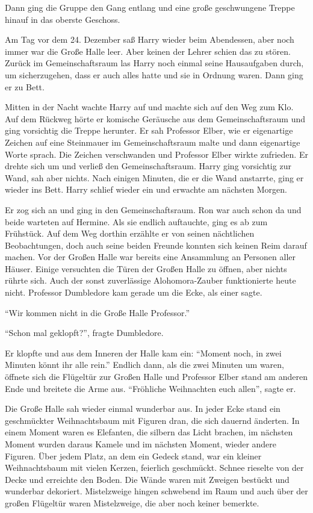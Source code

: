 Dann ging die Gruppe den Gang entlang und eine große geschwungene Treppe hinauf in das oberste Geschoss.

Am Tag vor dem 24. Dezember saß Harry wieder beim Abendessen, aber noch immer war die Große Halle leer. Aber keinen der Lehrer schien das zu stören. Zurück im Gemeinschaftsraum las Harry noch einmal seine Hausaufgaben durch, um sicherzugehen, dass er auch alles hatte und sie in Ordnung waren. Dann ging er zu Bett.

Mitten in der Nacht wachte Harry auf und machte sich auf den Weg zum Klo. Auf dem Rückweg hörte er komische Geräusche aus dem Gemeinschaftsraum und ging vorsichtig die Treppe herunter. Er sah Professor Elber, wie er eigenartige Zeichen auf eine Steinmauer im Gemeinschaftsraum malte und dann eigenartige Worte sprach. Die Zeichen verschwanden und Professor Elber wirkte zufrieden. Er drehte sich um und verließ den Gemeinschaftsraum. Harry ging vorsichtig zur Wand, sah aber nichts. Nach einigen Minuten, die er die Wand anstarrte, ging er wieder ins Bett.  Harry schlief wieder ein und erwachte am nächsten Morgen.

Er zog sich an und ging in den Gemeinschaftsraum. Ron war auch schon da und beide warteten auf Hermine. Als sie endlich auftauchte, ging es ab zum Frühstück. Auf dem Weg dorthin erzählte er von seinen nächtlichen Beobachtungen, doch auch seine beiden Freunde konnten sich keinen Reim darauf machen. Vor der Großen Halle war bereits eine Ansammlung an Personen aller Häuser. Einige versuchten die Türen der Großen Halle zu öffnen, aber nichts rührte sich. Auch der sonst zuverlässige Alohomora-Zauber funktionierte heute nicht. Professor Dumbledore kam gerade um die Ecke, als einer sagte.

\enquote{Wir kommen nicht in die Große Halle Professor.}

\enquote{Schon mal geklopft?}, fragte Dumbledore.

Er klopfte und aus dem Inneren der Halle kam ein: \enquote{Moment noch, in zwei Minuten könnt ihr alle rein.}  Endlich dann, als die zwei Minuten um waren, öffnete sich die Flügeltür zur Großen Halle und Professor Elber stand am anderen Ende und breitete die Arme aus. \enquote{Fröhliche Weihnachten euch allen}, sagte er.

Die Große Halle sah wieder einmal wunderbar aus. In jeder Ecke stand ein geschmückter Weihnachtsbaum mit Figuren dran, die sich dauernd änderten. In einem Moment waren es Elefanten, die silbern das Licht brachen, im nächsten Moment wurden daraus Kamele und im nächsten Moment, wieder andere Figuren. Über jedem Platz, an dem ein Gedeck stand, war ein kleiner Weihnachtsbaum mit vielen Kerzen, feierlich geschmückt. Schnee rieselte von der Decke und erreichte den Boden. Die Wände waren mit Zweigen bestückt und wunderbar dekoriert. Mistelzweige hingen schwebend im Raum und auch über der großen Flügeltür waren Mistelzweige, die aber noch keiner bemerkte.

